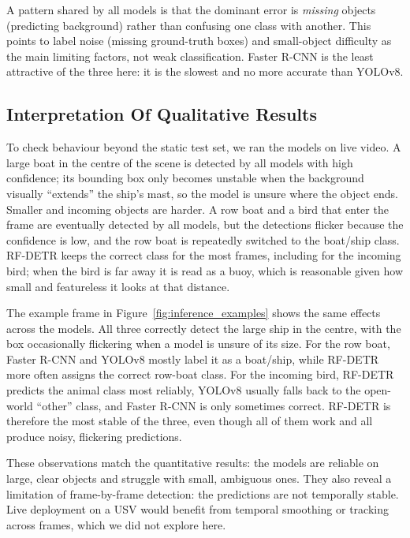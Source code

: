 \documentclass[11pt,a4paper]{article}
\begin{document}
A pattern shared by all models is that the dominant error is \emph{missing}
objects (predicting background) rather than confusing one class with another. This
points to label noise (missing ground-truth boxes) and small-object difficulty as
the main limiting factors, not weak classification. Faster R-CNN is the least
attractive of the three here: it is the slowest and no more accurate than YOLOv8.

\subsection{Interpretation Of Qualitative Results}
To check behaviour beyond the static test set, we ran the models on live video. A
large boat in the centre of the scene is detected by all models with high
confidence; its bounding box only becomes unstable when the background visually
``extends'' the ship's mast, so the model is unsure where the object ends. Smaller
and incoming objects are harder. A row boat and a bird that enter the frame are
eventually detected by all models, but the detections flicker because the
confidence is low, and the row boat is repeatedly switched to the boat/ship class.
RF-DETR keeps the correct class for the most frames, including for the incoming
bird; when the bird is far away it is read as a buoy, which is reasonable given how
small and featureless it looks at that distance.

The example frame in Figure~\ref{fig:inference_examples} shows the same effects
across the models. All three correctly detect the large ship in the centre, with
the box occasionally flickering when a model is unsure of its size. For the row
boat, Faster R-CNN and YOLOv8 mostly label it as a boat/ship, while RF-DETR more
often assigns the correct row-boat class. For the incoming bird, RF-DETR predicts
the animal class most reliably, YOLOv8 usually falls back to the open-world
``other'' class, and Faster R-CNN is only sometimes correct. RF-DETR is therefore
the most stable of the three, even though all of them work and all produce noisy,
flickering predictions.

These observations match the quantitative results: the models are reliable on
large, clear objects and struggle with small, ambiguous ones. They also reveal a
limitation of frame-by-frame detection: the predictions are not temporally stable.
Live deployment on a USV would benefit from temporal smoothing or tracking across
frames, which we did not explore here.
\end{document}
